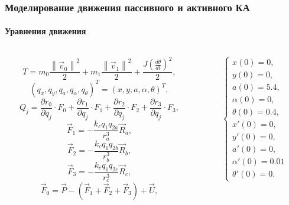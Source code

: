 \documentclass[10pt,pdf,hyperref={unicode}]{beamer}
\newcommand{\norm}[1]{\left\lVert#1\right\rVert}%
\begin{document}
\begin{frame}
\frametitle{Моделирование движения пассивного и активного КА}
\framesubtitle{Уравнения движения}
\begin{columns}[onlytextwidth]
	\begin{column}{0.5\textwidth}
	\begin{equation*}
		T = m_0 \frac{\norm{\vec{v}_0}^2}{2} + m_1 \frac{\norm{\vec{v}_1}^2}{2} + \frac{J\left(\frac{d\theta}{dt}\right)^2}{2},
	\end{equation*}	
	\begin{equation*}
			(q_x,q_y,q_a,q_\alpha,q_\theta)^T=(x,y,a,\alpha,\theta)^T,
	\end{equation*}
	\begin{equation*}
		Q_j = \frac{\partial r_0}{\partial q_j} \cdot F_0 + \frac{\partial r_1}{\partial q_j} \cdot F_1 +\frac{\partial r_2}{\partial q_j} \cdot F_2 +\frac{\partial r_3}{\partial q_j} \cdot F_3,
	\end{equation*}
	\begin{equation*}
		\vec{F}_1 = -\frac{k_c q_1 q_{2a}}{r_a^3}\vec{R}_a,
	\end{equation*}
	\begin{equation*}
		\vec{F}_2 = -\frac{k_c q_1 q_{2b}}{r_b^3}\vec{R}_b,
	\end{equation*}
	\begin{equation*}
		\vec{F}_3 = -\frac{k_c q_1 q_{2c}}{r_c^3}\vec{R}_c,
	\end{equation*}
	\begin{equation*}
		\vec{F}_0 = \vec{P} - (\vec{F}_1 + \vec{F}_2 + \vec{F}_3) + \vec{U},
	\end{equation*}
	\end{column}
	\begin{column}{0.5\textwidth}
	\begin{equation*}
		\begin{cases}
			x(0) = 0, \\
			y(0) = 0, \\
			a(0) = 5.4, \\
			\alpha(0) = 0,\\
			\theta(0) = 0.4,\\
			x'(0) = 0, \\
			y'(0) = 0, \\
			a'(0) = 0, \\
			\alpha'(0) = 0.01\\
			\theta'(0) = 0.
		\end{cases}
	\end{equation*}
	\end{column}
\end{columns}
\end{frame}
\end{document}
